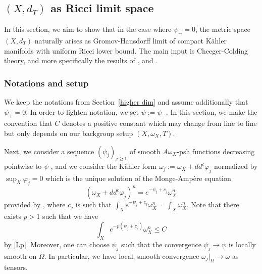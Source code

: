 \documentclass[a4paper,11pt,leqno,english]{smfart}
\theoremstyle{plain}
\theoremstyle{plain}
\numberwithin{equation}{section} %
\numberwithin{figure}{section} %
\theoremstyle{plain}
\theoremstyle{plain}
\theoremstyle{remark}
\theoremstyle{remark}
\theoremstyle{definition}
\theoremstyle{plain}
\theoremstyle{plain}
\theoremstyle{definition}
\renewcommand{\ge}{\geq}
\renewcommand{\le}{\leq}
\begin{document}




 \subsection{$(X,d_T)$ as Ricci limit space}\label{sec-ricci-limit}
 
 In this section, we aim to show that in the case where $\psi_+=0$, the metric space $(X,d_{T})$ naturally arises as Gromov-Hausdorff limit of compact Kähler manifolds with uniform Ricci lower bound. The main input is Cheeger-Colding theory, and more specifically the results of \cite{CCII}, \cite{LS18} and \cite{CJN}. 
  
 \subsubsection{Notations and setup}
 
We keep the notations from Section~\ref{higher dim} and assume additionally that $\psi_+=0$. In order to lighten notation, we set $\psi:=\psi_-$.  In this section, we make the convention that $C$ denotes a positive constant which may change from line to line but only depends on our backgroup setup $(X, \omega_X, T)$. 

Next, we consider a sequence $(\psi_j)_{j\ge 1}$ of smooth $A\omega_X$-psh functions decreasing pointwise to $\psi$ \cite{D92}, and we consider the Kähler form $\omega_j:=\omega_X+dd^c \varphi_j$ normalized by $\sup_X \varphi_j=0$ which is the unique solution of the Monge-Ampère equation 
\begin{equation}
\label{MA phi_j}
(\omega_X+dd^c \varphi_j)^n=e^{-\psi_j+c_j}\omega_X^n
\end{equation}
provided by \cite{Yau78}, where $c_j$ is such that $\int_X e^{-\psi_j+c_j}\omega_X^n=\int_X \omega_X^n$. Note that there exists $p>1$ such that we have 
\begin{equation}
\label{Lp2}
\int_X e^{-p(\psi_j+c_j)} \omega_X^n \le C
\end{equation} by \eqref{Lp}. Moreover, one can choose $\psi_j$ such that the convergence $\psi_j\to \psi$ is locally smooth on $\Omega$. In particular, we have local, smooth convergence $\omega_j|_{\Omega}\to \omega$ as tensors.  \\
\end{document}
